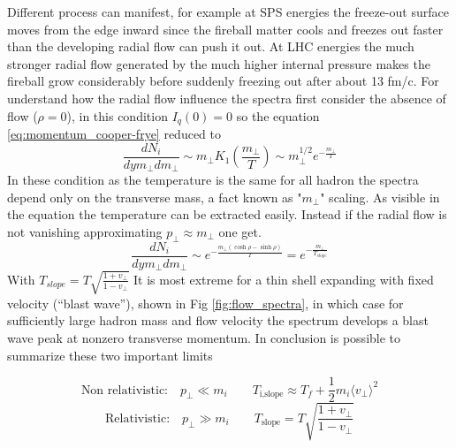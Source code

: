 \documentclass[12pt,a4paper]{book}
\begin{document}
	Different process can manifest, for example	at SPS energies the freeze-out surface moves from the edge inward since the fireball matter cools and freezes out faster than the developing radial flow can push it out. At LHC energies the much stronger radial flow generated by the much higher internal pressure makes the fireball grow considerably before suddenly freezing out after about 13 fm/c. 
	For understand how the radial flow influence the spectra first consider the absence of flow ($\rho=0$), in this condition $I_q(0)=0$ so the equation \ref{eq:momentum_cooper-frye} reduced to
	\begin{equation}
		\frac{dN_i}{dy m_\perp dm_\perp} \sim m_\perp K_1(\frac{m_\perp}{T}) \sim m_\perp^{1/2} e^{- \frac{m_\perp}{T}}
		\label{eq:vanish_rad_flow}
	\end{equation}
	In these condition as the temperature is the same for all hadron the spectra depend only on the transverse mass, a fact known as "$m_\perp$" scaling. As visible in the equation the temperature can be extracted easily. Instead if the radial flow is not vanishing approximating $p_\perp \approx m_\perp$ one get.
	\begin{equation}
		\frac{dN_i}{dy m_\perp dm_\perp} \sim  e^{- \frac{m_\perp (\cosh \rho - \sinh \rho)}{T}} =  e^{- \frac{m_\perp}{T_{slope}}}
		\label{eq:no_vanish_rad_flow}
	\end{equation}
	With $T_{slope} = T \sqrt{\frac{1+v_\perp}{1-v_\perp}}$ It is most extreme for a thin shell expanding with fixed velocity (“blast wave”), shown in Fig \ref{fig:flow_spectra}, in which case for sufficiently large hadron mass and flow velocity the spectrum develops a blast wave peak at nonzero transverse momentum. In conclusion is possible to summarize these two important limits
	
	\begin{equation}
		\text{Non relativistic:}\quad p_\perp \ll m_i \qquad T_{\text{i,slope}} \approx T_f + \frac{1}{2} m_i \langle v_\perp \rangle^2
		\label{eq:T_norel_limit}
	\end{equation}
	\begin{equation}
		\text{Relativistic:}\quad p_\perp \gg m_i \qquad T_{\text{slope}} = T \sqrt{\frac{1+v_\perp}{1-v_\perp}}
		\label{eq:T_rel_limit}
	\end{equation}
	
	
	
\end{document}
